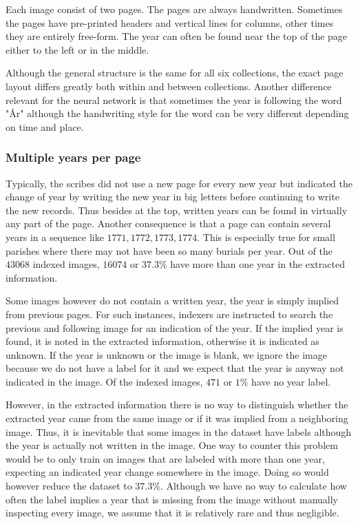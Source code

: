 Each image consist of two pages. The pages are always handwritten. Sometimes the pages have pre-printed headers and vertical lines for columns, other times they are entirely free-form.
The year can often be found near the top of the page either to the left or in the middle.

Although the general structure is the same for all six collections, the exact page layout differs greatly both within and between collections. Another difference relevant for the neural network is that sometimes the year is following the word "\r{A}r" although the handwriting style for the word can be very different depending on time and place.


\subsubsection{Multiple years per page}

Typically, the scribes did not use a new page for every new year but indicated the change of year by writing the new year in big letters before continuing to write the new records.
Thus besides at the top, written years can be found in virtually any part of the page. Another consequence is that a page can contain several years in a sequence like $1771, 1772, 1773, 1774$. This is especially true for small parishes where there may not have been so many burials per year. Out of the $43068$ indexed images, $16074$ or $37.3\%$ have more than one year in the extracted information.

Some images however do not contain a written year, the year is simply implied from previous pages. For such instances, indexers are instructed to search the previous and following image for an indication of the year. If the implied year is found, it is noted in the extracted information, otherwise it is indicated as unknown.
If the year is unknown or the image is blank, we ignore the image because we do not have a label for it and we expect that the year is anyway not indicated in the image. Of the indexed images, $471$ or $1\%$ have no year label.

However, in the extracted information there is no way to distinguish whether the extracted year came from the same image or if it was implied from a neighboring image. Thus, it is inevitable that some images in the dataset have labels although the year is actually not written in the image. One way to counter this problem would be to only train on images that are labeled with more than one year, expecting an indicated year change somewhere in the image. Doing so would however reduce the dataset to $37.3\%$.
Although we have no way to calculate how often the label implies a year that is missing from the image without manually inspecting every image, we assume that it is relatively rare and thus negligible.
